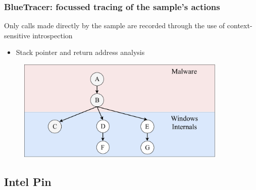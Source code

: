 \documentclass[compress]{beamer}
\begin{document}
\begin{frame}
    \frametitle{BlueTracer: focussed tracing of the sample's actions}

Only calls made directly by the sample are recorded through the use of context-sensitive introspection
\begin{itemize}
\item Stack pointer and return address analysis
\end{itemize}    
\medskip
	    \begin{figure}
    	\vspace{-0.3cm}
        \includegraphics[width=10cm]{image/MainImageTree.pdf}
    \end{figure}

\end{frame}

\iffalse
\subsection{Intel Pin}
\end{document}
